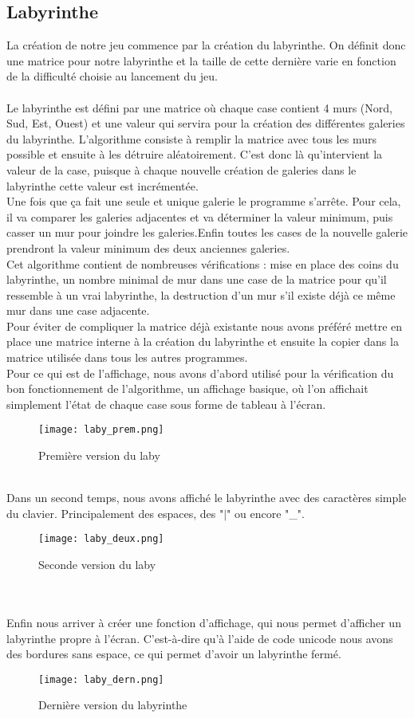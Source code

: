 ﻿\documentclass[12pt,a4paper,twoside]{article}
\begin{document}
\subsection{Labyrinthe}
La création de notre jeu commence par la création du labyrinthe. On définit donc une matrice pour notre labyrinthe et la taille de cette dernière varie en fonction de la difficulté choisie au lancement du jeu.
\\
\\
Le labyrinthe est défini par une matrice où chaque case contient 4 murs (Nord, Sud, Est, Ouest) et une valeur qui servira pour la création des différentes galeries du labyrinthe. L’algorithme consiste à remplir la matrice avec tous les murs possible et ensuite à les détruire aléatoirement. C’est donc là qu’intervient la valeur de la case, puisque à chaque nouvelle création de galeries dans le labyrinthe cette valeur est incrémentée. 
\\Une fois que ça fait une seule et unique galerie le programme s’arrête. Pour cela, il va comparer les galeries adjacentes et va déterminer la valeur minimum, puis casser un mur pour joindre les galeries.Enfin toutes les cases de la nouvelle galerie prendront la valeur minimum des deux anciennes galeries.\\
Cet algorithme contient de nombreuses vérifications : mise en place des coins du labyrinthe, un nombre minimal de mur dans une case de la matrice pour qu’il ressemble à un vrai labyrinthe, la destruction d’un mur s’il existe déjà ce même mur dans une case adjacente. 
\\Pour éviter de compliquer la matrice déjà existante nous avons préféré mettre en place une matrice interne à la création du labyrinthe et ensuite la copier dans la matrice utilisée dans tous les autres programmes.\\
Pour ce qui est de l’affichage, nous avons d’abord utilisé pour la vérification du bon fonctionnement de l’algorithme, un affichage basique, où l’on affichait simplement l’état de chaque case sous forme de tableau à l’écran.\\
\begin{figure}[h]
\centering
\texttt{[image: laby\_prem.png]}
\caption{Première version du laby}
\end{figure}
\\
Dans un second temps, nous avons affiché le labyrinthe avec des caractères simple du clavier. Principalement des espaces, des "$|$" ou encore "\_".\\
\begin{figure}[h]
\centering
\texttt{[image: laby\_deux.png]}
\caption{Seconde version du laby}
\end{figure}
\\
\\
Enfin nous arriver à créer une fonction d’affichage, qui nous permet d’afficher un labyrinthe propre à l’écran. C’est-à-dire qu’à l’aide de code unicode nous avons des bordures sans espace, ce qui permet d’avoir un labyrinthe fermé. \\
\begin{figure}[h]
\centering
\texttt{[image: laby\_dern.png]}
\caption{Dernière version du labyrinthe}
\end{figure}
\end{document}
